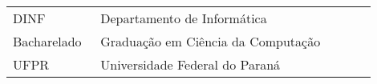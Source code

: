 

\begin{listaacron}

\begin{longtable}{p{0.2\linewidth}p{0.7\linewidth}}
DINF & Departamento de Informática\\
Bacharelado & Graduação em Ciência da Computação\\
UFPR & Universidade Federal do Paraná\\
\end{longtable}

\end{listaacron}

